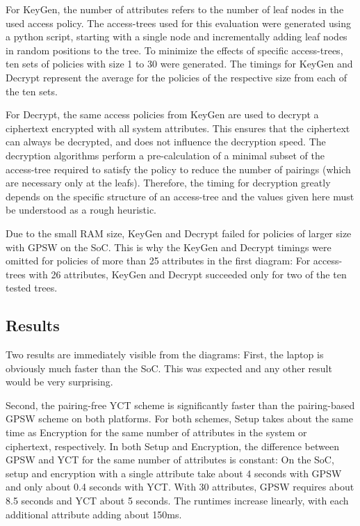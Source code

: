 For KeyGen, the number of attributes refers to the number of leaf nodes in the used access policy.
The \glspl{access-tree} used for this evaluation were generated using a python script, starting with a single node and incrementally adding leaf nodes in random positions to the tree.
To minimize the effects of specific \glspl{access-tree}, ten sets of policies with size 1 to 30 were generated.
The timings for KeyGen and Decrypt represent the average for the policies of the respective size from each of the ten sets.

For Decrypt, the same access policies from KeyGen are used to decrypt a ciphertext encrypted with all system attributes.
This ensures that the ciphertext can always be decrypted, and does not influence the decryption speed.
The decryption algorithms perform a pre-calculation of a minimal subset of the \gls{access-tree} required to satisfy the policy to reduce the number of pairings (which are necessary only at the leafs).
Therefore, the timing for decryption greatly depends on the specific structure of an \gls{access-tree} and the values given here must be understood as a rough heuristic.

Due to the small RAM size, KeyGen and Decrypt failed for policies of larger size with GPSW on the SoC.
This is why the KeyGen and Decrypt timings were omitted for policies of more than 25 attributes in the first diagram:
For \glspl{access-tree} with 26 attributes, KeyGen and Decrypt succeeded only for two of the ten tested trees.

\subsection{Results}
Two results are immediately visible from the diagrams:
First, the laptop is obviously much faster than the SoC.
This was expected and any other result would be very surprising.

Second, the pairing-free YCT scheme is significantly faster than the pairing-based GPSW scheme on both platforms. 
For both schemes, Setup takes about the same time as Encryption for the same number of attributes in the system or ciphertext, respectively.
In both Setup and Encryption, the difference between GPSW and YCT for the same number of attributes is constant:
On the SoC, setup and encryption with a single attribute take about 4 seconds with GPSW and only about 0.4 seconds with YCT.
With 30 attributes, GPSW requires about 8.5 seconds and YCT about 5 seconds.
The runtimes increase linearly, with each additional attribute adding about 150ms.

